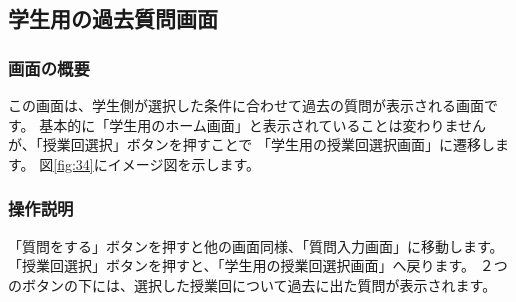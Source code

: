 \newpage

\subsection{学生用の過去質問画面}
\subsubsection{画面の概要}
この画面は、学生側が選択した条件に合わせて過去の質問が表示される画面です。
基本的に「学生用のホーム画面」と表示されていることは変わりませんが、「授業回選択」ボタンを押すことで
「学生用の授業回選択画面」に遷移します。
図\ref{fig:34}にイメージ図を示します。

\subsubsection{操作説明}
「質問をする」ボタンを押すと他の画面同様、「質問入力画面」に移動します。
「授業回選択」ボタンを押すと、「学生用の授業回選択画面」へ戻ります。
２つのボタンの下には、選択した授業回について過去に出た質問が表示されます。



